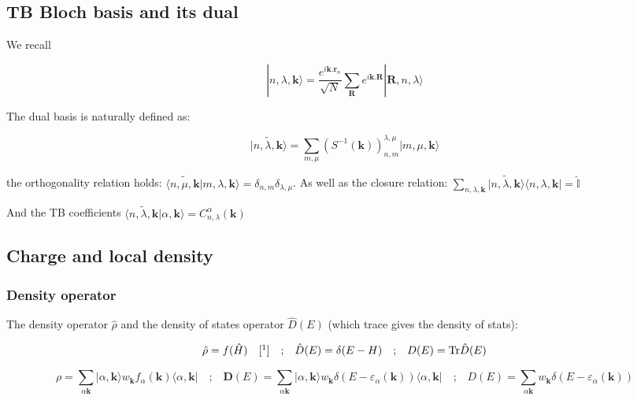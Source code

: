 \documentclass{article}
\newcommand{\bra}[1]{\langle #1|}
\newcommand{\ket}[1]{|#1\rangle}
\newcommand{\op}[1]{\hat{#1}}
\begin{document}
\subsection{TB Bloch basis and its dual}

\noindent
We recall

\[\ket{n,\lambda,\mathbf{k}}=\frac{e^{i \mathbf{k}.\mathbf{r}_n}}{\sqrt{N}} \sum_{\mathbf{R}} e^{i \mathbf{k}.\mathbf{R}} \ket{\mathbf{R},n,\lambda }\]

\noindent
The dual basis is naturally defined as:

\[\displaystyle \widetilde{\ket{n,\lambda, \mathbf{k}}} =\sum_{m,\mu} 
(S^{-1}(\mathbf{k}))_{n,m}^{\lambda, \mu} \ket{m,\mu,\mathbf{k}}\]

\noindent the orthogonality relation holds: $\langle \widetilde{n,\mu, \mathbf{k}}|m,\lambda,\mathbf{k}\rangle=\delta_{n,m}\delta_{\lambda,\mu}$.
\noindent
As well as the closure relation:
$\displaystyle \sum_{n,\lambda,\mathbf{k} } 
\widetilde{\ket{n,\lambda,\mathbf{k}}} \bra{n,\lambda,\mathbf{k}}=\op{\mathbb{I}}$

\noindent
And the TB coefficients $\langle 
\widetilde{n,\lambda,\mathbf{k}}|\alpha, \mathbf{k} \rangle= 
C_{n,\lambda}^{\alpha}(\mathbf{k})$

\subsection{Charge and local density}


\subsubsection{Density operator}

\noindent The density operator $\op{\rho}$ and the density of states operator $\op{D}(E)$ (which trace gives the density of stats):

\[\op{\rho}=f(\op{H})\quad[\footnote{$f(x)=\frac{1}{1+\exp(\frac{x-E_f}{k_BT})}$}]
\quad \mbox{;} \quad \op{D}(E)=\delta(E-H) \quad \mbox{;}
\quad D(E)=\mbox{Tr}\op{D}(E) \]

\[\rho=\sum_{\alpha \mathbf{k}} \ket{\alpha,\mathbf{k}} w_{\mathbf{k}} f_{\alpha}(\mathbf{k})
\bra{\alpha,\mathbf{k}} \quad \mbox{;} \quad
\bm{D}(E)=\sum_{\alpha \mathbf{k}} \ket{\alpha,\mathbf{k}}
w_{\mathbf{k}}\delta(E-\varepsilon_{\alpha}(\mathbf{k}))\bra{\alpha,\mathbf{k}} \quad \mbox{;} 
\quad D(E)=\sum_{\alpha \mathbf{k}} w_{\mathbf{k}} \delta(E-\varepsilon_{\alpha}(\mathbf{k}))
\]
\end{document}
